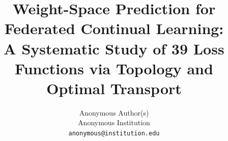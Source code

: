 \documentclass[10pt,twocolumn,letterpaper]{article}
\title{Weight-Space Prediction for Federated Continual Learning: \\
A Systematic Study of 39 Loss Functions via Topology and Optimal Transport}
\author{Anonymous Author(s)\\
Anonymous Institution\\
{\tt\small anonymous@institution.edu}
}
\begin{document}
\maketitle
    






{
    \small
    
    
}

% 
\end{document}
